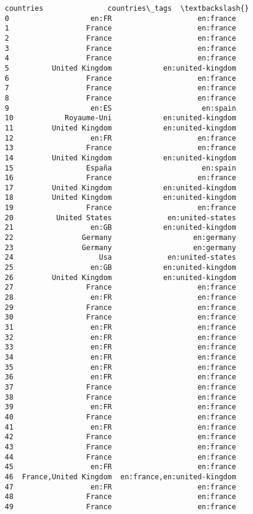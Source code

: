 \documentclass[11pt]{article}
\begin{document}
\begin{tcolorbox}[breakable, size=fbox, boxrule=.5pt, pad at break*=1mm, opacityfill=0]
\begin{Verbatim}[commandchars=\\\{\}]
                countries               countries\_tags  \textbackslash{}
0                   en:FR                    en:france
1                  France                    en:france
2                  France                    en:france
3                  France                    en:france
4                  France                    en:france
5          United Kingdom            en:united-kingdom
6                  France                    en:france
7                  France                    en:france
8                  France                    en:france
9                   en:ES                     en:spain
10            Royaume-Uni            en:united-kingdom
11         United Kingdom            en:united-kingdom
12                  en:FR                    en:france
13                 France                    en:france
14         United Kingdom            en:united-kingdom
15                 España                     en:spain
16                 France                    en:france
17         United Kingdom            en:united-kingdom
18         United Kingdom            en:united-kingdom
19                 France                    en:france
20          United States             en:united-states
21                  en:GB            en:united-kingdom
22                Germany                   en:germany
23                Germany                   en:germany
24                    Usa             en:united-states
25                  en:GB            en:united-kingdom
26         United Kingdom            en:united-kingdom
27                 France                    en:france
28                  en:FR                    en:france
29                 France                    en:france
30                 France                    en:france
31                  en:FR                    en:france
32                  en:FR                    en:france
33                  en:FR                    en:france
34                  en:FR                    en:france
35                  en:FR                    en:france
36                  en:FR                    en:france
37                 France                    en:france
38                 France                    en:france
39                  en:FR                    en:france
40                 France                    en:france
41                  en:FR                    en:france
42                 France                    en:france
43                 France                    en:france
44                 France                    en:france
45                  en:FR                    en:france
46  France,United Kingdom  en:france,en:united-kingdom
47                  en:FR                    en:france
48                 France                    en:france
49                 France                    en:france


\end{Verbatim}
\end{tcolorbox}
\end{document}

